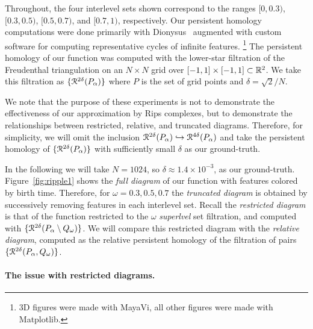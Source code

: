 Throughout, the four interlevel sets shown correspond to the ranges $[0, 0.3)$, $[0.3, 0.5)$, $[0.5, 0.7)$, and $[0.7, 1)$, respectively.
Our persistent homology computations were done primarily with Dionysus~\cite{morozov12dionysus} augmented with custom software for computing representative cycles of infinite features.
\footnote{3D figures were made with MayaVi, all other figures were made with Matplotlib.}
The persistent homology of our function was computed with the lower-star filtration of the Freudenthal triangulation on an $N\times N$ grid over $[-1,1]\times[-1,1]\subset\mathbb{R}^2$.
We take this filtration as $\{\mathcal{R}^{2\delta}(P_\alpha)\}$ where $P$ is the set of grid points and $\delta = \sqrt{2} / N$.

We note that the purpose of these experiments is not to demonstrate the effectiveness of our approximation by Rips complexes, but to demonstrate the relationships between restricted, relative, and truncated diagrams.
Therefore, for simplicity, we will omit the inclusion $\mathcal{R}^{2\delta}(P_\alpha)\hookrightarrow\mathcal{R}^{4\delta}(P_\alpha)$ and take the persistent homology of $\{\mathcal{R}^{2\delta}(P_\alpha)\}$ with sufficiently small $\delta$ as our ground-truth.

In the following we will take $N = 1024$, so $\delta\approx 1.4\times 10^{-3}$, as our ground-truth.
Figure~\ref{fig:ripple1} shows the \emph{full diagram} of our function with features colored by birth time.
Therefore, for $\omega = 0.3, 0.5, 0.7$ the \emph{truncated diagram} is obtained by successively removing features in each interlevel set.
Recall the \emph{restricted diagram} is that of the function restricted to the $\omega$ \emph{superlvel} set filtration, and computed with $\{\mathcal{R}^{2\delta}(P_\alpha\setminus Q_\omega)\}$.
We will compare this restricted diagram with the \emph{relative diagram}, computed as the relative persistent homology of the filtration of pairs $\{\mathcal{R}^{2\delta}(P_\alpha, Q_\omega)\}$.

\paragraph*{The issue with restricted diagrams.}


